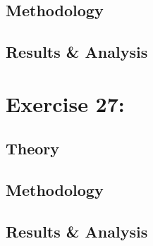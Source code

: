 \documentclass[%
reprint,
amsmath,amssymb,
aps,
floatfix
]{revtex4-2}
\begin{document}
		\subsection{Methodology}
		\subsection{Results \& Analysis}
		
	\section{Exercise 27: }
		\subsection{Theory}
		\subsection{Methodology}
		\subsection{Results \& Analysis}
		
	\clearpage
	
	\clearpage
	\onecolumngrid
	\appendix

	
	
\end{document}
